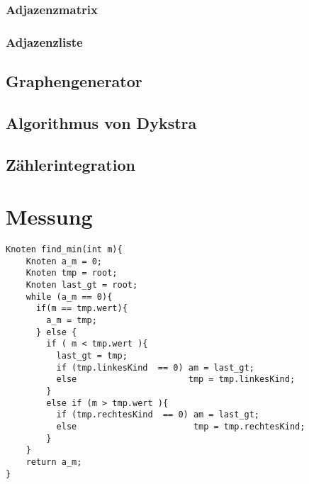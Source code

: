 \documentclass[
   draft=false
  ,paper=a4
  ,twoside=false
  ,fontsize=11pt
  ,headsepline
  ,DIV11
  ,parskip=full+
]{scrartcl} %
\begin{document}
\subsubsection{Adjazenzmatrix}

\subsubsection{Adjazenzliste}

\subsection{Graphengenerator}

\subsection{Algorithmus von Dykstra}

\subsection{Zählerintegration}

\section{Messung}


\normalsize \flushleft
  \begin{lstlisting}
Knoten find_min(int m){
	Knoten a_m = 0;
	Knoten tmp = root;
	Knoten last_gt = root;
	while (a_m == 0){
	  if(m == tmp.wert){
	    a_m = tmp;
	  } else {
	    if ( m < tmp.wert ){
	      last_gt = tmp;
	      if (tmp.linkesKind  == 0) am = last_gt;
	      else                      tmp = tmp.linkesKind;
	    }
	    else if (m > tmp.wert ){
	      if (tmp.rechtesKind  == 0) am = last_gt;
	      else                       tmp = tmp.rechtesKind;
	    }
	}
	return a_m;
}
\end{lstlisting}
\end{document}
